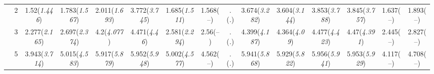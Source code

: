 \documentclass{article}
\begin{document}
\begin{table}[tbp]
{\begin{tabularx}{\textwidth}{lCCCCCCCCCCCCCC}
&2&1.52\newline (\emph{1.446})&1.783\newline (\emph{1.567})&2.011\newline (\emph{1.693})&3.772\newline (\emph{3.745})&1.685\newline (\emph{1.511})&1.568\newline (--)&.\newline (\emph{.})&3.674\newline (\emph{3.282})&3.604\newline (\emph{3.144})&3.853\newline (\emph{3.788})&3.845\newline (\emph{3.757})&1.637\newline (--)&1.893\newline (--) \tabularnewline
&3&2.277\newline (\emph{2.165})&2.697\newline (\emph{2.374})&4.2\newline (\emph{4.077})&4.471\newline (\emph{4.46})&2.581\newline (\emph{2.294})&2.56\newline (--)&.\newline (\emph{.})&4.399\newline (\emph{4.187})&4.364\newline (\emph{4.09})&4.477\newline (\emph{4.423})&4.47\newline (\emph{4.391})&2.445\newline (--)&2.827\newline (--) \tabularnewline
&5&3.943\newline (\emph{3.714})&5.015\newline (\emph{4.583})&5.917\newline (\emph{5.879})&5.952\newline (\emph{5.948})&5.002\newline (\emph{4.577})&4.562\newline (--)&.\newline (\emph{.})&5.941\newline (\emph{5.868})&5.929\newline (\emph{5.822})&5.956\newline (\emph{5.941})&5.953\newline (\emph{5.929})&4.117\newline (--)&4.708\newline (--) \tabularnewline

\end{tabularx}}
\end{table}
\end{document}
